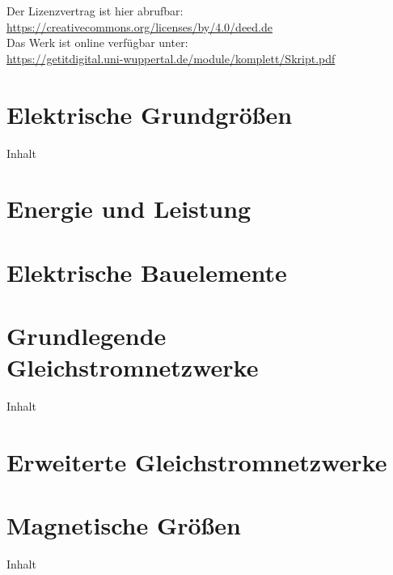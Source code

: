 \documentclass[twoside, a4paper]{article}
\begin{document}
Der Lizenzvertrag ist hier abrufbar:\\
\url{https://creativecommons.org/licenses/by/4.0/deed.de}\\
Das Werk ist online verfügbar unter:\\
\url{https://getitdigital.uni-wuppertal.de/module/komplett/Skript.pdf}
\newpage

{\setlength{\parskip}{0.05ex}    %
	\tableofcontents
	\newpage
}

\printnomenclature
\cleardoublepage

\pagestyle{fancyplain}
\fancyfoot[EL,OR]{}

\cleardoublepage
\part{Elektrische Grundgrößen}
{Inhalt}

\cleardoublepage
\part{Energie und Leistung}

\cleardoublepage
\part{Elektrische Bauelemente}

\cleardoublepage
\part{Grundlegende Gleichstromnetzwerke}
{Inhalt}

\cleardoublepage
\part{Erweiterte Gleichstromnetzwerke}

\cleardoublepage
\part{Magnetische Größen}
{Inhalt}
\end{document}
